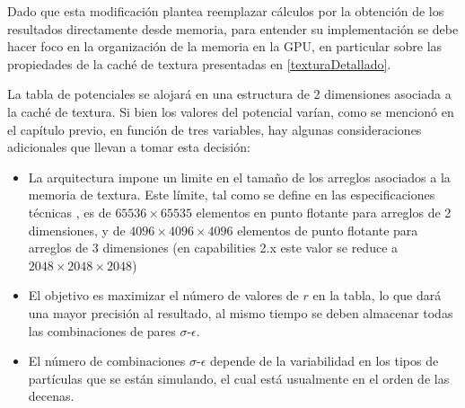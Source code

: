 
Dado que esta modificación plantea reemplazar cálculos por la obtención de los resultados directamente desde memoria, 
para entender su implementación se debe hacer foco en la organización de la memoria en la GPU, 
en particular sobre las propiedades de la caché de textura presentadas en \ref{texturaDetallado}.





La tabla de potenciales se alojará en una estructura de 2 dimensiones asociada a la caché de textura. 
Si bien los valores del potencial varían, como se mencionó en el capítulo previo, en función de tres variables, hay algunas consideraciones adicionales que llevan a tomar esta decisión:

\begin{itemize}
\item La arquitectura impone un limite en el tamaño de los arreglos asociados a la memoria de textura. 
Este límite, tal como se define en las especificaciones técnicas \cite{cudaProgrammingGuide}, es de $65536 \times 65535$ elementos en punto flotante para arreglos de 2 dimensiones, 
y de $4096 \times 4096 \times 4096$ elementos de punto flotante para arreglos de 3 dimensiones (en capabilities 2.x este valor se reduce a $2048 \times 2048 \times 2048$)


\item El objetivo es maximizar el número de valores de $r$ en la tabla, lo que dará una mayor precisión al resultado, al mismo tiempo se deben almacenar todas las combinaciones de pares $\sigma$-$\epsilon$.

\item El número de combinaciones $\sigma$-$\epsilon$ depende de la variabilidad en los tipos de partículas que se están simulando, el cual está usualmente en el orden de las decenas.

\end{itemize}

